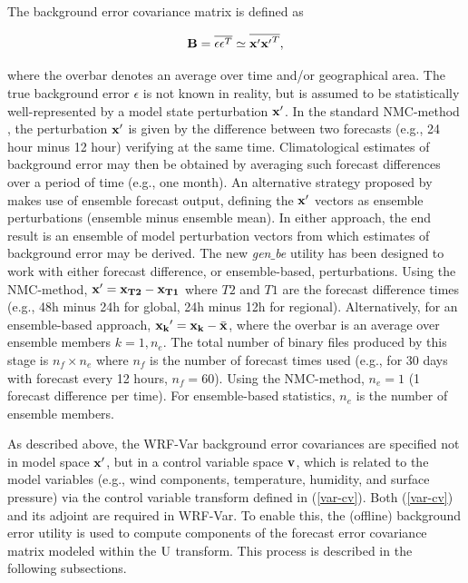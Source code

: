 The background error covariance matrix is defined as 

\begin{equation}
{\bf B}=\overline{\epsilon \epsilon^{T}} \simeq \overline{{\bf x'}{\bf x'}^{T}},
\label{var-b}
\end{equation}

\noindent where the overbar denotes an average over time and/or geographical area. The true 
background error $\epsilon$ is not known in reality, but is assumed to be statistically
well-represented by a model state perturbation ${\bf x'}$. In the standard NMC-method
\citep{parrish92}, the perturbation ${\bf x'}$ is given by the difference between 
two forecasts (e.g., 24 hour minus 12 hour) verifying at the same time. Climatological 
estimates of background error may then be obtained by averaging such forecast 
differences over a period of time (e.g., one month). An alternative strategy proposed by 
\citep{fisher03} makes use of ensemble forecast output, defining the ${\bf x'}$ vectors as 
ensemble perturbations (ensemble minus ensemble mean). In either approach, the end 
result is an ensemble of model perturbation vectors from which estimates of 
background error may be derived. The new {\it gen$\_$be} utility has been designed to work with 
either forecast difference, or ensemble-based, perturbations.
Using the NMC-method, ${\bf x}'={\bf x_{T2}}-{\bf x_{T1}}$ where $T2$ and $T1$ 
are the forecast difference times (e.g., 48h minus 24h for global, 24h minus 12h for regional). 
Alternatively, for an ensemble-based approach, ${\bf x_{k}}'={\bf x_{k}}-\bar{\bf 
x}$, where the overbar is an average over ensemble members $k=1,n_{e}$. The total 
number of binary files produced by this stage is $n_{f} \times n_e$ where $n_f$ is the 
number of forecast times used (e.g., for 30 days with forecast every 12 hours, $n_f=60$). 
Using the NMC-method, $n_e=1$ (1 forecast difference per time). For ensemble-based 
statistics, $n_e$ is the number of ensemble members.

As described above, the WRF-Var background error covariances are specified not in 
model space ${\bf x'}$, but in a control variable space ${\bf v}$, which is related to the model variables 
(e.g., wind components, temperature, humidity, and surface pressure) via the control 
variable transform defined in (\ref{var-cv}). Both (\ref{var-cv}) and 
its adjoint are required in WRF-Var. To enable this, the (offline) background error utility is used
to compute components of the forecast error covariance matrix modeled within the 
${\rm U}$ transform. This process is described in the following subsections.

